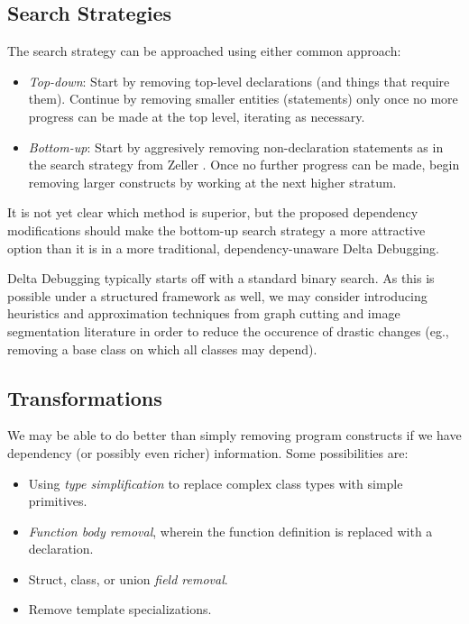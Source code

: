 \documentclass[11pt]{article}
\begin{document}
\subsection{Search Strategies}
The search strategy can be approached using either common approach:
\begin{itemize}
\item \emph{Top-down}: Start by removing top-level declarations (and things that
  require them). Continue by removing smaller entities (statements) only once no
  more progress can be made at the top level, iterating as necessary.
\item \emph{Bottom-up}: Start by aggresively removing non-declaration statements
  as in the search strategy from Zeller \citet{dd}. Once no further progress can
  be made, begin removing larger constructs by working at the next higher
  stratum.
\end{itemize}
It is not yet clear which method is superior, but the proposed dependency
modifications should make the bottom-up search strategy a more attractive option
than it is in a more traditional, dependency-unaware Delta Debugging.

Delta Debugging typically starts off with a standard binary search. As this is
possible under a structured framework as well, we may consider introducing
heuristics and approximation techniques from graph cutting and image
segmentation literature \citep{nc} in order to reduce the occurence of
drastic changes (eg., removing a base class on which all classes may depend).

\subsection{Transformations}
\label{subsec:transform}
We may be able to do better than simply removing program constructs if we have
dependency (or possibly even richer) information.  Some possibilities are:
\begin{itemize}
\item Using \emph{type simplification} to replace complex class types with
  simple primitives.
\item \emph{Function body removal}, wherein the function definition is replaced
  with a declaration.
\item Struct, class, or union \emph{field removal}.
\item Remove template specializations.
\end{itemize}
\end{document}
